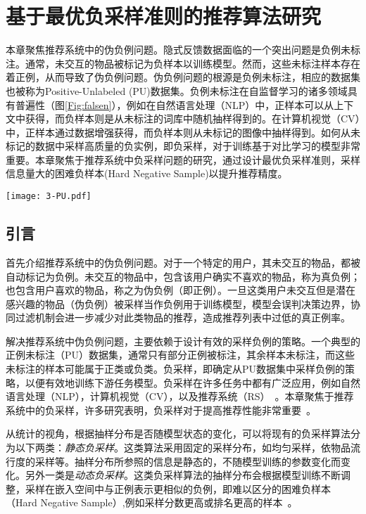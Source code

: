\chapter{基于最优负采样准则的推荐算法研究}
\label{cha:thirdsection}
本章聚焦推荐系统中的伪负例问题。隐式反馈数据面临的一个突出问题是负例未标注。通常，未交互的物品被标记为负样本以训练模型。然而，这些未标注样本存在着正例，从而导致了伪负例问题。伪负例问题的根源是负例未标注，相应的数据集也被称为Positive-Unlabeled (PU)数据集。负例未标注在自监督学习的诸多领域具有普遍性（图\ref{Fig:falsen}），例如在自然语言处理（NLP）中，正样本可以从上下文中获得，而负样本则是从未标注的词库中随机抽样得到的。在计算机视觉（CV）中，正样本通过数据增强获得，而负样本则从未标记的图像中抽样得到。如何从未标记的数据中采样高质量的负实例，即负采样，对于训练基于对比学习的模型非常重要。本章聚焦于推荐系统中负采样问题的研究，通过设计最优负采样准则，采样信息量大的困难负样本(Hard Negative Sample)以提升推荐精度。
\begin{figure*}[h!]
	\centering
	\texttt{[image: 3-PU.pdf]}
	\caption{Positive-Unlabeled(PU)问题示意图}
	\label{Fig:falsen}
\end{figure*}
\section{引言}
首先介绍推荐系统中的伪负例问题。对于一个特定的用户，其未交互的物品，都被自动标记为负例。未交互的物品中，包含该用户确实不喜欢的物品，称为真负例；也包含用户喜欢的物品，称之为伪负例（即正例）。一旦这类用户未交互但是潜在感兴趣的物品（伪负例）被采样当作负例用于训练模型，模型会误判决策边界，协同过滤机制会进一步减少对此类物品的推荐，造成推荐列表中过低的真正例率。

解决推荐系统中伪负例问题，主要依赖于设计有效的采样负例的策略。一个典型的正例未标注（PU）数据集，通常只有部分正例被标注，其余样本未标注，而这些未标注的样本可能属于正类或负类。负采样，即确定从PU数据集中采样负例的策略，以便有效地训练下游任务模型。负采样在许多任务中都有广泛应用，例如自然语言处理（NLP）\cite{Mikolov:2013:NIPS,Tang:2015:WWW}，计算机视觉（CV）\cite{Qin:2021:AAAI,Zhao:2021:IJCAI}，以及推荐系统（RS）~\cite{Steffen:2014:WSDM,Zhang:2013:SIGIR,Ding:2020:NIPS}。本章聚焦于推荐系统中的负采样，许多研究表明，负采样对于提高推荐性能非常重要~\cite{Steffen:2014:WSDM,Zhang:2013:SIGIR,Ding:2020:NIPS,Park:2019:WWW,Huang:2021:KDD,Ding:2019:IJCAI,Yang:2020:KDD}。

从统计的视角，根据抽样分布是否随模型状态的变化，可以将现有的负采样算法分为以下两类：\textit{静态负采样}\cite{Steffen:2009:UAI,Chen:2017:KDD,Mikolov:2013:NIPS,Xiangnan:2020:SIGIR,Weike:2013:IJCAI,Yu:2018:CIKM,Wang:2019:SIGIR}。这类算法采用固定的采样分布，如均匀采样，依物品流行度的采样等。抽样分布所参照的信息是静态的，不随模型训练的参数变化而变化。另外一类是\textit{动态负采样}\cite{Steffen:2014:WSDM,Zhang:2013:SIGIR,Wang:2020:WWW,Chen:2019:WWW}。这类负采样算法的抽样分布会根据模型训练不断调整，采样在嵌入空间中与正例表示更相似的负例，即难以区分的困难负样本（Hard  Negative Sample）,例如采样分数更高或排名更高的样本~\cite{Steffen:2014:WSDM,Zhang:2013:SIGIR,Zhao:2015:CIKM}。

